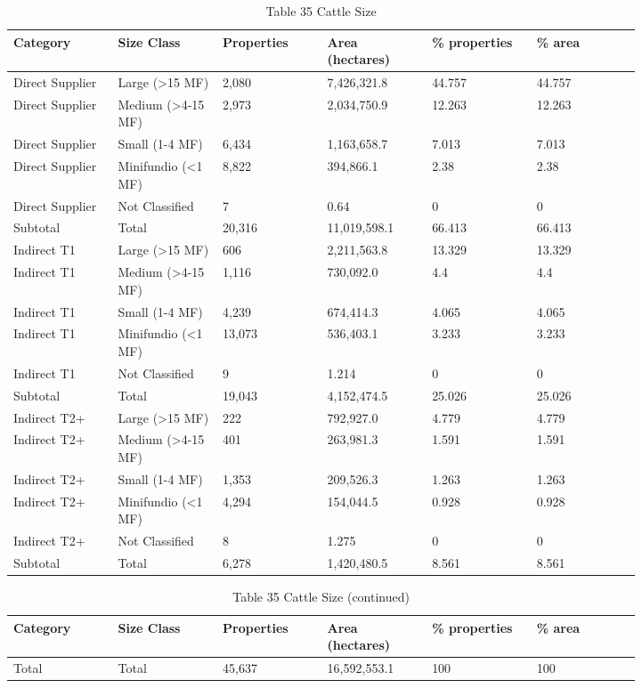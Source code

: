\documentclass[12pt]{article}
\begin{document}
\begin{table}[H]
\centering
\caption{Table 35 Cattle Size}
{\fontsize{12}{14}\selectfont
\setlength{\tabcolsep}{3pt}
\renewcommand{\arraystretch}{1.08}
\begin{tabular}{p{0.137\linewidth}p{0.137\linewidth}p{0.137\linewidth}p{0.137\linewidth}p{0.137\linewidth}p{0.137\linewidth}}
\toprule
Category & Size Class & Properties & Area (hectares) & \% properties & \% area \\
\midrule
Direct Supplier & Large (>15 MF) & 2,080 & 7,426,321.8 & 44.757 & 44.757 \\
Direct Supplier & Medium (>4-15 MF) & 2,973 & 2,034,750.9 & 12.263 & 12.263 \\
Direct Supplier & Small (1-4 MF) & 6,434 & 1,163,658.7 & 7.013 & 7.013 \\
Direct Supplier & Minifundio (<1 MF) & 8,822 & 394,866.1 & 2.38 & 2.38 \\
Direct Supplier & Not Classified & 7 & 0.64 & 0 & 0 \\
Subtotal & Total & 20,316 & 11,019,598.1 & 66.413 & 66.413 \\
Indirect T1 & Large (>15 MF) & 606 & 2,211,563.8 & 13.329 & 13.329 \\
Indirect T1 & Medium (>4-15 MF) & 1,116 & 730,092.0 & 4.4 & 4.4 \\
Indirect T1 & Small (1-4 MF) & 4,239 & 674,414.3 & 4.065 & 4.065 \\
Indirect T1 & Minifundio (<1 MF) & 13,073 & 536,403.1 & 3.233 & 3.233 \\
Indirect T1 & Not Classified & 9 & 1.214 & 0 & 0 \\
Subtotal & Total & 19,043 & 4,152,474.5 & 25.026 & 25.026 \\
Indirect T2+ & Large (>15 MF) & 222 & 792,927.0 & 4.779 & 4.779 \\
Indirect T2+ & Medium (>4-15 MF) & 401 & 263,981.3 & 1.591 & 1.591 \\
Indirect T2+ & Small (1-4 MF) & 1,353 & 209,526.3 & 1.263 & 1.263 \\
Indirect T2+ & Minifundio (<1 MF) & 4,294 & 154,044.5 & 0.928 & 0.928 \\
Indirect T2+ & Not Classified & 8 & 1.275 & 0 & 0 \\
Subtotal & Total & 6,278 & 1,420,480.5 & 8.561 & 8.561 \\
\bottomrule
\end{tabular}
}
\end{table}
\begin{table}[H]
\centering
\caption{Table 35 Cattle Size (continued)}
{\fontsize{12}{14}\selectfont
\setlength{\tabcolsep}{3pt}
\renewcommand{\arraystretch}{1.08}
\begin{tabular}{p{0.137\linewidth}p{0.137\linewidth}p{0.137\linewidth}p{0.137\linewidth}p{0.137\linewidth}p{0.137\linewidth}}
\toprule
Category & Size Class & Properties & Area (hectares) & \% properties & \% area \\
\midrule
Total & Total & 45,637 & 16,592,553.1 & 100 & 100 \\
\bottomrule
\end{tabular}
}
\end{table}
\end{document}
